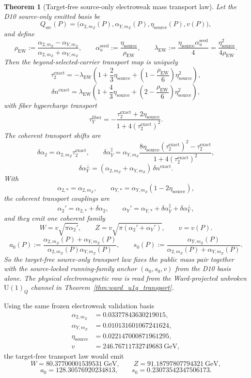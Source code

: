 \documentclass[11pt]{article}
\newtheorem{theorem}{Theorem}[section]
\newcommand{\U}{\mathrm{U}}
\begin{document}
\begin{theorem}[Target-free source-only electroweak mass transport law]
Let the D10 source-only emitted basis be
\[
Q_{\mathrm{src}}(P)=
\bigl(\alpha_{2,m_Z}(P),\alpha_{Y,m_Z}(P),\eta_{\mathrm{source}}(P),v(P)\bigr),
\]
and define
\[
\rho_{\mathrm{EW}}
:=
\frac{\alpha_{2,m_Z}-\alpha_{Y,m_Z}}{\alpha_{2,m_Z}+\alpha_{Y,m_Z}},
\qquad
\alpha_u^{\mathrm{seed}}
:=
\frac{\eta_{\mathrm{source}}}{\rho_{\mathrm{EW}}},
\qquad
\lambda_{\mathrm{EW}}
:=
\frac{\eta_{\mathrm{source}}\alpha_u^{\mathrm{seed}}}{4}
=
\frac{\eta_{\mathrm{source}}^2}{4\rho_{\mathrm{EW}}}.
\]
Then the beyond-selected-carrier transport map is uniquely
\[
\tau_2^{\mathrm{exact}}
=
-\lambda_{\mathrm{EW}}
\left(
1+\frac23\eta_{\mathrm{source}}
+
\left(1-\frac{\rho_{\mathrm{EW}}}{6}\right)\eta_{\mathrm{source}}^2
\right),
\]
\[
\delta n^{\mathrm{exact}}
=
\lambda_{\mathrm{EW}}
\left(
1+\frac43\eta_{\mathrm{source}}
+
\left(2-\frac{\rho_{\mathrm{EW}}}{6}\right)\eta_{\mathrm{source}}^2
\right),
\]
with fiber hypercharge transport
\[
\tau_Y^{\mathrm{fiber}}
=
-\frac{\tau_2^{\mathrm{exact}}+2\eta_{\mathrm{source}}}
{1+4(\tau_2^{\mathrm{exact}})^2}.
\]
The coherent transport shifts are
\[
\delta\alpha_2=\alpha_{2,m_Z}\tau_2^{\mathrm{exact}},
\qquad
\delta\alpha_Y^{\parallel}
=
\alpha_{Y,m_Z}
\frac{8\eta_{\mathrm{source}}(\tau_2^{\mathrm{exact}})^2-\tau_2^{\mathrm{exact}}}
{1+4(\tau_2^{\mathrm{exact}})^2},
\]
\[
\delta\alpha_Y^{\perp}
=
(\alpha_{2,m_Z}+\alpha_{Y,m_Z})\,\delta n^{\mathrm{exact}}.
\]
With
\[
\alpha_{2,*}=\alpha_{2,m_Z},
\qquad
\alpha_{Y,*}=\alpha_{Y,m_Z}(1-2\eta_{\mathrm{source}}),
\]
the coherent transport couplings are
\[
\alpha_2'=\alpha_{2,*}+\delta\alpha_2,
\qquad
\alpha_Y'=\alpha_{Y,*}+\delta\alpha_Y^{\parallel}+\delta\alpha_Y^{\perp},
\]
and they emit one coherent family
\[
W=v\sqrt{\pi\alpha_2'},
\qquad
Z=v\sqrt{\pi(\alpha_2'+\alpha_Y')},
\qquad
v=v(P).
\]
\[
a_0(P)
:=
\frac{\alpha_{2,m_Z}(P)+\alpha_{Y,m_Z}(P)}
{\alpha_{2,m_Z}(P)\alpha_{Y,m_Z}(P)},
\qquad
s_0(P)
:=
\frac{\alpha_{Y,m_Z}(P)}
{\alpha_{2,m_Z}(P)+\alpha_{Y,m_Z}(P)}.
\]
So the target-free source-only transport law fixes the public mass pair together with the source-locked
running-family anchor \((a_0,s_0,v)\) from the D10 basis alone. The physical electromagnetic row
is read from the Ward-projected unbroken \(\U(1)_Q\) channel in
Theorem~\ref{thm:ward_u1q_transport}.
\end{theorem}

Using the same frozen electroweak validation basis
\[
\begin{aligned}
\alpha_{2,m_Z}&=0.03377843630219015,\\
\alpha_{Y,m_Z}&=0.010131601067241624,\\
\eta_{\mathrm{source}}&=0.022147000871961295,\\
v&=246.76711732749683~\mathrm{GeV},
\end{aligned}
\]
the target-free transport law would emit
\[
W=80.37700001539531~\mathrm{GeV},
\qquad
Z=91.18797807794321~\mathrm{GeV},
\]
\[
a_0=128.30576920234813,
\qquad
s_0=0.23073542347506173.
\]
\end{document}
